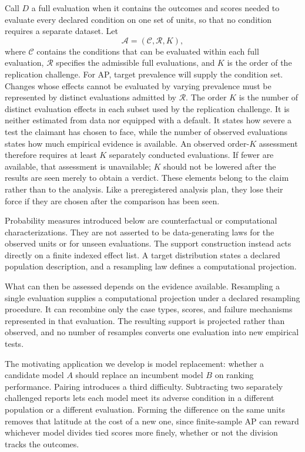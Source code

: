\documentclass[11pt]{article}
\newcommand{\Regime}{\mathcal{R}}
\newcommand{\Assess}{\mathcal{A}}
\newcommand{\CSet}{\mathcal{C}}
\theoremstyle{remark}
\begin{document}
Call $D$ a full evaluation when it contains the outcomes and scores needed to
evaluate every declared condition on one set of units, so that no condition
requires a separate dataset. Let
\[
\Assess=(\CSet,\Regime,K),
\]
where $\CSet$ contains the conditions that can be evaluated within each full
evaluation, $\Regime$ specifies the admissible full evaluations, and $K$ is
the order of the replication challenge. For AP, target prevalence will supply
the condition set. Changes whose effects cannot be evaluated by varying
prevalence must be represented by distinct evaluations admitted by $\Regime$.
The order $K$ is the number of distinct evaluation effects in each subset
used by the replication challenge. It is neither estimated from data nor
equipped with a default. It states how severe a test the claimant has chosen
to face, while the number of observed evaluations states how much empirical
evidence is available. An observed order-$K$ assessment therefore requires at
least $K$ separately conducted evaluations. If fewer are available, that
assessment is unavailable; $K$ should not be lowered after the results are
seen merely to obtain a verdict.
These elements belong to the claim rather than to the analysis. Like a
preregistered analysis plan, they lose their force if they are chosen after the
comparison has been seen.

Probability measures introduced below are counterfactual or computational
characterizations. They are not asserted to be data-generating laws for the
observed units or for unseen evaluations. The support construction instead
acts directly on a finite indexed effect list. A target distribution states a
declared population description, and a resampling law defines a computational
projection.

What can then be assessed depends on the evidence available. Resampling a
single evaluation supplies a computational projection under a declared
resampling procedure. It can recombine only the case types, scores, and failure
mechanisms represented in that evaluation. The resulting support is projected rather than observed, and no
number of resamples converts one evaluation into new empirical tests.

The motivating application we develop is model replacement: whether a candidate
model $A$ should replace an incumbent model $B$ on ranking performance. Pairing
introduces a third difficulty. Subtracting two separately challenged reports
lets each model meet its adverse condition in a different population or a
different evaluation. Forming the difference on the same units removes that
latitude at the cost of a new one, since finite-sample AP can reward whichever
model divides tied scores more finely, whether or not the division tracks the
outcomes.
\end{document}
